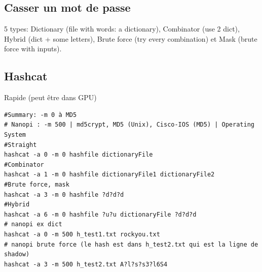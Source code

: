 \subsection{Casser un mot de passe}
5 types: Dictionary (file with words: a dictionary), Combinator (use 2 dict), Hybrid (dict + some letters), Brute force (try every combination) et Mask (brute force with inputs).

\subsection{Hashcat}
Rapide (peut être dans GPU)
\begin{Verbatim}[breaklines=true, breakanywhere=true]
#Summary: -m 0 à MD5
# Nanopi : -m 500 | md5crypt, MD5 (Unix), Cisco-IOS (MD5) | Operating System
#Straight
hashcat -a 0 -m 0 hashfile dictionaryFile
#Combinator
hashcat -a 1 -m 0 hashfile dictionaryFile1 dictionaryFile2
#Brute force, mask
hashcat -a 3 -m 0 hashfile ?d?d?d
#Hybrid
hashcat -a 6 -m 0 hashfile ?u?u dictionaryFile ?d?d?d
# nanopi ex dict
hashcat -a 0 -m 500 h_test1.txt rockyou.txt
# nanopi brute force (le hash est dans h_test2.txt qui est la ligne de shadow)
hashcat -a 3 -m 500 h_test2.txt A?l?s?s3?l6S4
\end{Verbatim}
